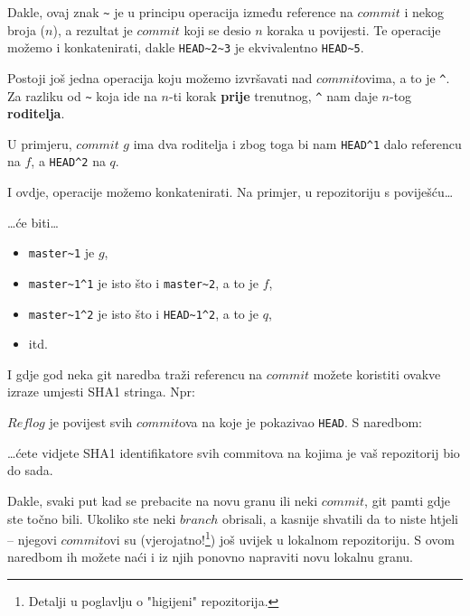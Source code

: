 Dakle, ovaj znak \verb+~+ je u principu operacija između reference na $commit$ i nekog broja ($n$), a rezultat je $commit$ koji se desio $n$ koraka u povijesti.
Te operacije možemo i konkatenirati, dakle \verb+HEAD~2~3+ je ekvivalentno \verb+HEAD~5+.

Postoji još jedna operacija koju možemo izvršavati nad $commit$ovima, a to je \verb+^+.
Za razliku od \verb+~+ koja ide na $n$-ti korak \textbf{prije} trenutnog, \verb+^+ nam daje $n$-tog \textbf{roditelja}.

U primjeru, $commit$ $g$ ima dva roditelja i zbog toga bi nam \verb+HEAD^1+ dalo referencu na $f$, a \verb+HEAD^2+ na $q$.

I ovdje, operacije možemo konkatenirati.
Na primjer, u repozitoriju s poviješću\dots



\dots{}će biti\dots

\begin{itemize}
    \item \verb+master~1+ je $g$,
    \item \verb+master~1^1+ je isto što i \verb+master~2+, a to je $f$,
    \item \verb+master~1^2+ je isto što i \verb+HEAD~1^2+, a to je $q$,
    \item itd.
\end{itemize}

I gdje god neka git naredba traži referencu na $commit$ možete koristiti ovakve izraze umjesti SHA1 stringa.
Npr:






$Reflog$ je povijest svih $commit$ova na koje je pokazivao \verb+HEAD+.
S naredbom:


\dots{}ćete vidjete SHA1 identifikatore svih commitova na kojima je vaš repozitorij bio do sada. 

Dakle, svaki put kad se prebacite na novu granu ili neki $commit$, git pamti gdje ste točno bili.
Ukoliko ste neki $branch$ obrisali, a kasnije shvatili da to niste htjeli -- njegovi $commit$ovi su (vjerojatno!\footnote{Detalji u poglavlju o "higijeni" repozitorija.}) još uvijek u lokalnom repozitoriju. 
S ovom naredbom ih možete naći i iz njih ponovno napraviti novu lokalnu granu.

